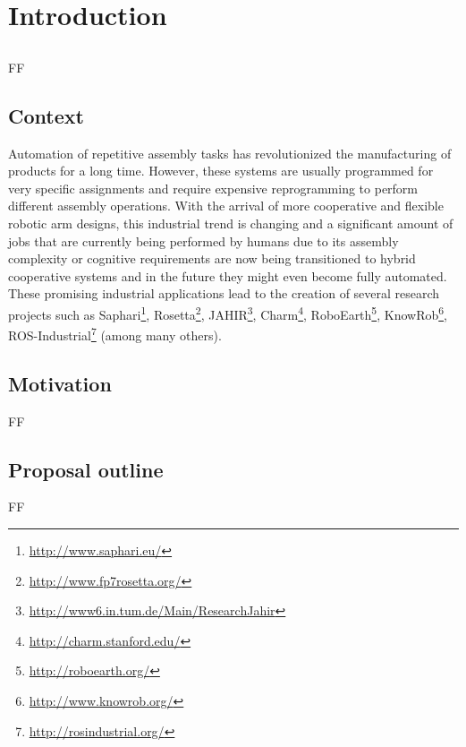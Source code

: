 \chapter{Introduction}\label{chap:introduction}



\section*{}

FF



\section{Context}

Automation of repetitive assembly tasks has revolutionized the manufacturing of products for a long time. However, these systems are usually programmed for very specific assignments and require expensive reprogramming to perform different assembly operations. With the arrival of more cooperative and flexible robotic arm designs, this industrial trend is changing and a significant amount of jobs that are currently being performed by humans due to its assembly complexity or cognitive requirements are now being transitioned to hybrid cooperative systems \cite{Surdilovic2010} and in the future they might even become fully automated. These promising industrial applications lead to the creation of several research projects such as Saphari\footnote{\url{http://www.saphari.eu/}}, Rosetta\footnote{\url{http://www.fp7rosetta.org/}}, JAHIR\footnote{\url{http://www6.in.tum.de/Main/ResearchJahir}}, Charm\footnote{\url{http://charm.stanford.edu/}}, RoboEarth\footnote{\url{http://roboearth.org/}}, KnowRob\footnote{\url{http://www.knowrob.org/}}, ROS-Industrial\footnote{\url{http://rosindustrial.org/}} (among many others).



\section{Motivation}

FF


\section{Proposal outline}

FF
